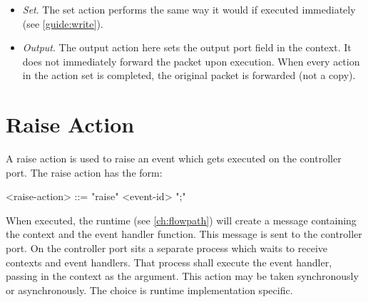 \begin{itemize}
\item \textit{Set}. The set action performs the same way it would if executed immediately (see \ref{guide:write}). 

\item \textit{Output}. The output action here sets the output port field in the context. It does not immediately forward the packet upon execution. When every action in the action set is completed, the original packet is forwarded (not a copy).
\end{itemize}

\section{Raise Action} \label{guide:raise}

A raise action is used to raise an event which gets executed on the controller port. The raise action has the form:

\begin{minip}
\begin{grammar}
<raise-action> ::= "raise" <event-id> ";"
\end{grammar}
\end{minip}

When executed, the runtime (see \ref{ch:flowpath}) will create a message containing the context and the event handler function. This message is sent to the controller port. On the controller port sits a separate process which waits to receive contexts and event handlers. That process shall execute the event handler, passing in the context as the argument. This action may be taken synchronously or asynchronously. The choice is runtime implementation specific.

